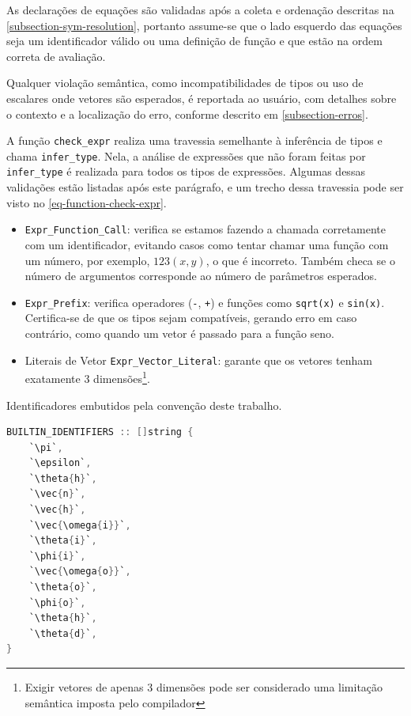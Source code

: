 As declarações de equações são validadas após a coleta e ordenação descritas na \autoref{subsection-sym-resolution}, portanto assume-se que o lado esquerdo das equações seja um identificador válido ou uma definição de função e que estão na ordem correta de avaliação.

Qualquer violação semântica, como incompatibilidades de tipos ou uso de escalares onde vetores são esperados, é reportada ao usuário, com detalhes sobre o contexto e a localização do erro, conforme descrito em \autoref{subsection-erros}.

A função \verb"check_expr" realiza uma travessia semelhante à inferência de tipos e chama \texttt{infer\_type}. Nela, a análise de expressões que não foram feitas por \texttt{infer\_type} é realizada para todos os tipos de expressões. Algumas dessas validações estão listadas após este parágrafo, e um trecho dessa travessia pode ser visto no \autoref{eq-function-check-expr}.

\begin{itemize}
    \item \verb`Expr_Function_Call`: verifica se estamos fazendo a chamada corretamente com um identificador, evitando casos como tentar chamar uma função com um número, por exemplo, $123(x,y)$, o que é incorreto. Também checa se o número de argumentos corresponde ao número de parâmetros esperados.
    \item \verb`Expr_Prefix`: verifica operadores (\verb`-`, \verb`+`) e funções como \verb`sqrt(x)` e \verb`sin(x)`. Certifica-se de que os tipos sejam compatíveis, gerando erro em caso contrário, como quando um vetor é passado para a função seno.
    \item Literais de Vetor \verb`Expr_Vector_Literal`: garante que os vetores tenham exatamente 3 dimensões\footnote{Exigir vetores de apenas 3 dimensões pode ser considerado uma limitação semântica imposta pelo compilador}.
\end{itemize}




\begin{codigo}[H]
    \caption{\small Identificadores embutidos pela convenção deste trabalho.}
    \label{cod-builtins}
\begin{lstlisting}[language=C, numbers=none, frame=none, inputencoding=latin1]
BUILTIN_IDENTIFIERS :: []string {
    `\pi`,
    `\epsilon`,
    `\theta{h}`,
    `\vec{n}`,
    `\vec{h}`,
    `\vec{\omega{i}}`,
    `\theta{i}`,
    `\phi{i}`,
    `\vec{\omega{o}}`,
    `\theta{o}`,
    `\phi{o}`,
    `\theta{h}`,
    `\theta{d}`,
}
\end{lstlisting}
\end{codigo}


